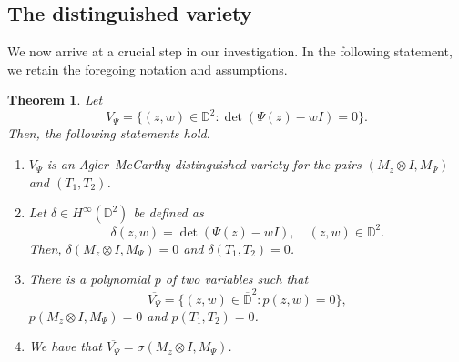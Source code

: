 \documentclass[10pt]{amsart}
\newcommand{\bD}{{\mathbb{D}}}
\newcommand{\ol}{\overline}
\newtheorem{theorem}[lemma]{Theorem}
\theoremstyle{definition}
\begin{document}
\subsection{The distinguished variety}
We now arrive at a crucial step in our investigation. In the following statement, we retain the foregoing notation and assumptions.

\begin{theorem}\label{T:distvarspec}
Let
\[
V_\Psi=\{(z,w)\in \bD^2: \det(\Psi(z)-wI)=0\}.
\] 
Then, the following statements hold.
\begin{enumerate}[{\rm (i)}]
\item $V_\Psi$ is an Agler--McCarthy distinguished variety for the pairs $(M_z\otimes I,M_\Psi)$ and $(T_1,T_2)$.
\item Let $\delta\in H^\infty(\bD^2)$ be defined as
\[
\delta(z,w)=\det(\Psi(z)-w I), \quad (z,w)\in \bD^2.
\]
Then, $\delta(M_z\otimes I, M_\Psi)=0$ and $\delta(T_1,T_2)=0$.
\item There is a polynomial $p$ of two variables such that 
\[\ol{V_\Psi}=\{(z,w)\in \ol{\bD}^2: p(z,w)=0\},\]
$p(M_z\otimes I, M_\Psi)=0$ and $p(T_1,T_2)=0$.

\item  We have that $\ol{V_\Psi}=\sigma(M_z\otimes I,M_\Psi)$.
\end{enumerate}
\end{theorem}
\end{document}
